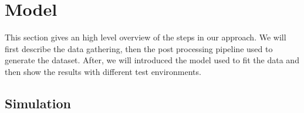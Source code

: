 \documentclass[../document.tex]{subfiles}
\begin{document}
\section{Model}
This section gives an high level overview of the steps in our approach. We will first describe the data gathering,  then the post processing pipeline used to generate the dataset. After, we will introduced the model used to fit the data and then show the results with different test environments.

\subsection{Simulation}
\end{document}
